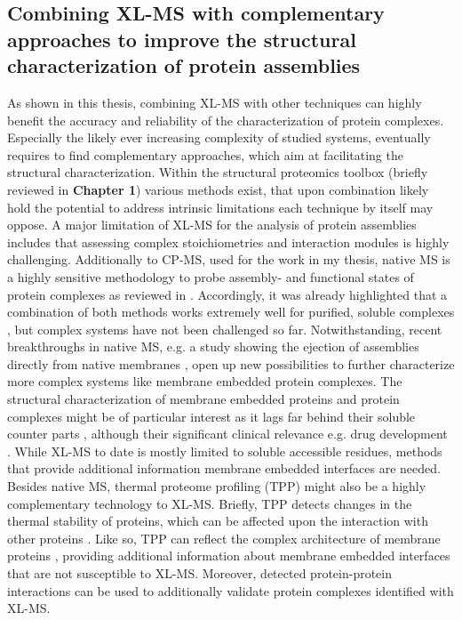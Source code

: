 \subsection*{Combining XL-MS with complementary approaches to improve the structural characterization of protein assemblies}
As shown in this thesis, combining XL-MS with other techniques can highly benefit the accuracy and reliability of the characterization of protein complexes. Especially the likely ever increasing complexity of studied systems, eventually requires to find complementary approaches, which aim at facilitating the structural characterization. Within the structural proteomics toolbox (briefly reviewed in \textbf{Chapter 1}) various methods exist, that upon combination likely hold the potential to address intrinsic limitations each technique by itself may oppose.
A major limitation of XL-MS for the analysis of protein assemblies includes that assessing complex stoichiometries and interaction modules is highly challenging. Additionally to CP-MS, used for the work in my thesis, native MS is a highly sensitive methodology to probe assembly- and functional states of protein complexes as reviewed in \cite{RN31}.
Accordingly, it was already highlighted that a combination of both methods works extremely well for purified, soluble complexes \cite{RN32, RN33}, but complex systems have not been challenged so far. Notwithstanding, recent breakthroughs in native MS, e.g. a study showing the ejection of assemblies directly from native membranes \cite{RN34}, open up new possibilities to further characterize more complex systems like membrane embedded protein complexes.
The structural characterization of membrane embedded proteins and protein complexes might be of particular interest as it lags far behind their soluble counter parts \cite{RN35, RN36}, although their significant clinical relevance e.g. drug development \cite{RN37}. While XL-MS to date is mostly limited to soluble accessible residues, methods that provide additional information membrane embedded interfaces are needed. Besides native MS, thermal proteome profiling (TPP) might also be a highly complementary technology to XL-MS. Briefly, TPP detects changes in the thermal stability of proteins, which can be affected upon the interaction with other proteins \cite{RN38}. Like so, TPP can reflect the complex architecture of membrane proteins \cite{RN38}, providing additional information about membrane embedded interfaces that are not susceptible to XL-MS. Moreover, detected protein-protein interactions can be used to additionally validate protein complexes identified with XL-MS.
